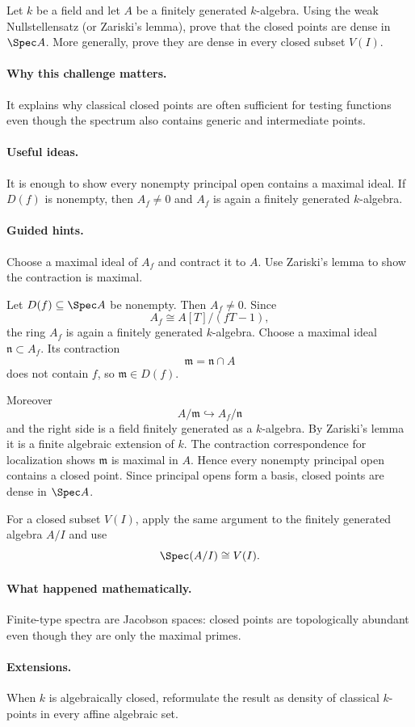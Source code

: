 \begin{problem}
Let $k$ be a field and let $A$ be a finitely generated $k$-algebra.  Using the weak
Nullstellensatz (or Zariski's lemma), prove that the closed points are dense in $\Spec A$.
More generally, prove they are dense in every closed subset $V(I)$.
\end{problem}

\paragraph{Why this challenge matters.}
It explains why classical closed points are often sufficient for testing functions even
though the spectrum also contains generic and intermediate points.

\paragraph{Useful ideas.}
It is enough to show every nonempty principal open contains a maximal ideal.  If $D(f)$ is
nonempty, then $A_f\neq0$ and $A_f$ is again a finitely generated $k$-algebra.

\paragraph{Guided hints.}
Choose a maximal ideal of $A_f$ and contract it to $A$.  Use Zariski's lemma to show the
contraction is maximal.

\begin{solution}
Let $D(f)\subseteq\Spec A$ be nonempty.  Then $A_f\neq0$.  Since
\[
A_f\cong A[T]/(fT-1),
\]
the ring $A_f$ is again a finitely generated $k$-algebra.  Choose a maximal ideal
$\mathfrak n\subset A_f$.  Its contraction
\[
\mathfrak m=\mathfrak n\cap A
\]
does not contain $f$, so $\mathfrak m\in D(f)$.

Moreover
\[
A/\mathfrak m
\hookrightarrow
A_f/\mathfrak n
\]
and the right side is a field finitely generated as a $k$-algebra.  By Zariski's lemma it
is a finite algebraic extension of $k$.  The contraction correspondence for localization
shows $\mathfrak m$ is maximal in $A$.  Hence every nonempty principal open contains a
closed point.  Since principal opens form a basis, closed points are dense in $\Spec A$.

For a closed subset $V(I)$, apply the same argument to the finitely generated algebra
$A/I$ and use
\[
\Spec(A/I)\cong V(I).
\]
\end{solution}

\paragraph{What happened mathematically.}
Finite-type spectra are Jacobson spaces: closed points are topologically abundant even
though they are only the maximal primes.

\paragraph{Extensions.}
When $k$ is algebraically closed, reformulate the result as density of classical
$k$-points in every affine algebraic set.
